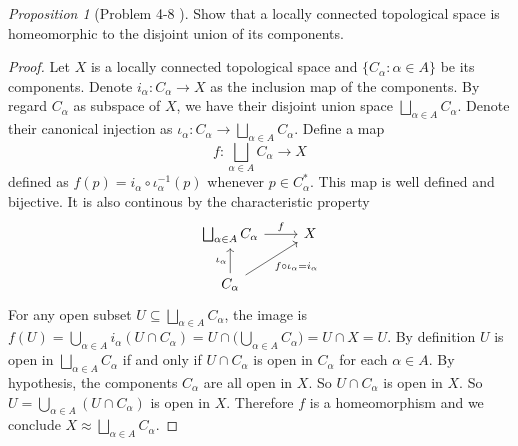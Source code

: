\documentclass[a4paper]{article}
\theoremstyle{remark}
\newtheorem{prop}{Proposition}
\newcommand{\subhim}{\subseteq} %
\begin{document}
\begin{prop}[Problem 4-8 \cite{LeeTM}]
	Show that a locally connected topological space is homeomorphic to the disjoint union of its components.
\end{prop}
\begin{proof}
	Let $X$ is a locally connected topological space and $\{C_{\alpha}: \alpha \in A \}$ be its components. Denote $i_{\alpha} : C_{\alpha} \to X$ as the inclusion map of the components. By regard $C_{\alpha}$ as subspace of $X$, we have their disjoint union space $\bigsqcup_{\alpha \in A} C_{\alpha}$. Denote their canonical injection as $\iota_{\alpha} : C_{\alpha} \to \bigsqcup_{\alpha \in A} C_{\alpha}$. Define a map
	$$
	f: \bigsqcup_{\alpha \in A} C_{\alpha} \to X
	$$
	defined as $f(p) = i_{\alpha} \circ \iota_{\alpha}^{-1} (p)$ whenever $p \in C^*_{\alpha}$. This map is well defined and bijective. It is also continous by the characteristic property
	\[
	\begin{tikzcd}
	\bigsqcup_{\alpha \in A} C_{\alpha} \arrow[r,"f"] &  X\\
	C_{\alpha} \arrow[u,"\iota_{\alpha}"] \arrow[ur,"f \circ \iota_{\alpha} = i_{\alpha}",swap]& 
	\end{tikzcd}
	\]
	For any open subset $U \subhim \bigsqcup_{\alpha \in A} C_{\alpha}$, the image is $f(U) = \bigcup_{\alpha \in A} i_{\alpha}(U\cap C_{\alpha}) = U \cap \big(\bigcup_{\alpha \in A} C_{\alpha}\big) = U \cap X=U$. By definition $U$ is open in $\bigsqcup_{\alpha \in A} C_{\alpha}$ if and only if $U\cap C_{\alpha}$ is open in $C_{\alpha}$ for each $\alpha \in A$. By hypothesis, the components $C_{\alpha}$ are all open in $X$. So $U \cap C_{\alpha}$ is open in $X$. So $U= \bigcup_{\alpha \in A} (U \cap C_{\alpha})$ is open in $X$. Therefore $f$ is a homeomorphism and we conclude $X \approx \bigsqcup_{\alpha \in A} C_{\alpha}$.
\end{proof}
\end{document}
